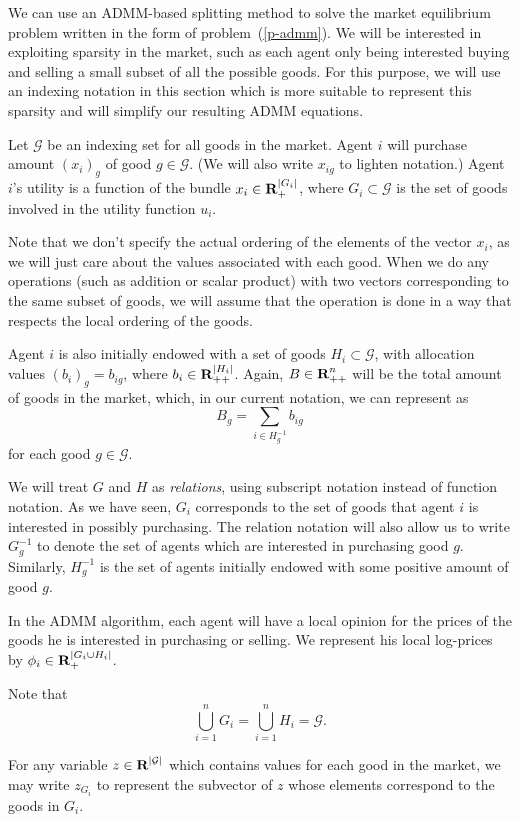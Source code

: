 \documentclass[12pt]{article}
\begin{document}
We can use an ADMM-based splitting method \cite{boyd2011distributed} to
solve the market equilibrium problem written in the form of
problem~(\ref{p-admm}).
We will be interested in exploiting sparsity in the market, such
as each agent only being interested buying and selling a small subset 
of all the possible goods.
For this purpose, we will use an indexing notation in this section which is
more suitable to represent this sparsity and will simplify our resulting
ADMM equations.

Let $\mathcal{G}$ be an indexing set for all goods
in the market.
Agent $i$ will purchase amount $(x_i)_g$ of good $g \in \mathcal{G}$.
(We will also write $x_{ig}$ to lighten notation.)
Agent $i$'s utility is a function of the bundle $x_i \in {\mbox{\bf R}}_{+}^{|G_i|}$,
where $G_i \subset \mathcal{G}$ is the set of goods involved in the utility
function $u_i$.

Note that we don't specify the actual ordering of the elements
of the vector $x_i$, as we will just care about the values associated with
each good.
When we do any operations (such as addition or scalar product) with
two vectors corresponding to the same subset of goods, we will
assume that the operation is done in a way that respects the local ordering of
the goods.

Agent $i$ is also initially endowed with a set of goods
$H_i \subset \mathcal{G}$,
with allocation values $(b_i)_g = b_{ig}$, where $b_i \in {\mbox{\bf R}}_{++}^{|H_i|}$.
Again, $B \in {\mbox{\bf R}}^n_{++}$ will be the total amount of goods in the market, which, in our
current notation, we can represent as
\[
B_g = \sum\limits_{i \in H^{-1}_g} b_{ig}
\]
for each good $g \in \mathcal{G}$.

We will treat $G$ and $H$ as \emph{relations},
using subscript notation instead of function notation.
As we have seen, $G_i$ corresponds to the set of goods that agent $i$ is
interested
in possibly purchasing.
The relation notation will also allow us to
write $G^{-1}_g$ to denote the set of agents which are interested in
purchasing good $g$.
Similarly, $H^{-1}_g$ is the set of agents initially endowed with some
positive amount of good $g$.

In the ADMM algorithm, each agent will have a local opinion for the prices
of the goods he is interested in purchasing or selling.
We represent his local log-prices
by $\phi_i \in {\mbox{\bf R}}_+^{|G_i \cup H_i|}$.

Note that
\[
\bigcup_{i=1}^n G_i = \bigcup_{i=1}^n H_i = \mathcal{G}.
\]

For any variable $z \in {\mbox{\bf R}}^{|\mathcal{G}|}$ which contains values for
each good in the market, we may write $z_{G_i}$ to represent the subvector
of $z$ whose elements correspond to the goods in $G_i$.
\end{document}
